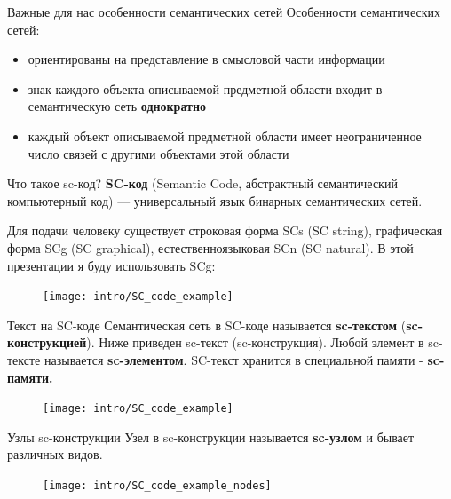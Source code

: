 \begin{frame}{Важные для нас особенности семантических сетей}
  Особенности семантических сетей:
  \begin{itemize}
  \item ориентированы на представление в смысловой части информации
  \item знак каждого объекта описываемой предметной области входит в
    семантическую сеть \textbf{однократно}
  \item каждый объект описываемой предметной области имеет
    неограниченное число связей с другими объектами этой области
  \end{itemize}
\end{frame}


\begin{frame}[shrink=10]{Что такое sc-код?}
  \textbf{SC-код} (Semantic Code, абстрактный семантический
  компьютерный код) — универсальный язык бинарных семантических сетей.
  
  Для подачи человеку существует строковая форма SCs (SC string),
  графическая форма SCg (SC graphical), естественноязыковая SCn (SC
  natural). В этой презентации я буду использовать SCg:
  \begin{figure}
    \centering
    \texttt{[image: intro/SC\_code\_example]}
  \end{figure}
\end{frame}

\begin{frame}[shrink=5]{Текст на SC-коде}
  Семантическая сеть в SC-коде называется \textbf{sc-текстом}
  (\textbf{sc-конструкцией}).  Ниже приведен sc-текст
  (sc-конструкция). Любой элемент в sc-тексте называется
  \textbf{sc-элементом}. SC-текст хранится в специальной памяти -
  \textbf{sc-памяти.}

  \begin{figure}
    \centering
    \texttt{[image: intro/SC\_code\_example]}
  \end{figure}
\end{frame}

\begin{frame}{Узлы sc-конструкции}
  Узел в sc-конструкции называется \textbf{sc-узлом} и бывает
  различных видов.
  
  \begin{figure}
    \centering
    \texttt{[image: intro/SC\_code\_example\_nodes]}
  \end{figure}
\end{frame}

